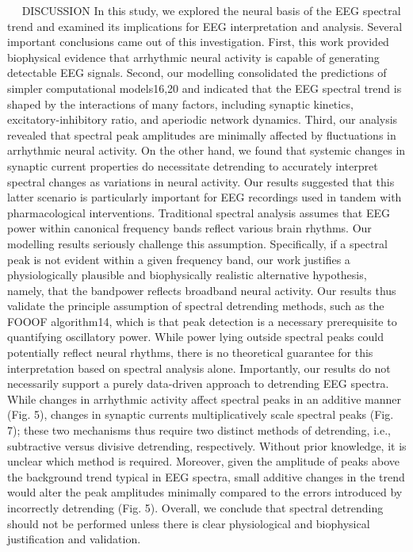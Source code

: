  
DISCUSSION 
In this study, we explored the neural basis of the EEG spectral trend and examined its implications for EEG interpretation and analysis. Several important conclusions came out of this investigation. First, this work provided biophysical evidence that arrhythmic neural activity is capable of generating detectable EEG signals. Second, our modelling consolidated the predictions of simpler computational models16,20 and indicated that the EEG spectral trend is shaped by the interactions of many factors, including synaptic kinetics, excitatory-inhibitory ratio, and aperiodic network dynamics. Third, our analysis revealed that spectral peak amplitudes are minimally affected by fluctuations in arrhythmic neural activity. On the other hand, we found that systemic changes in synaptic current properties do necessitate detrending to accurately interpret spectral changes as variations in neural activity. Our results suggested that this latter scenario is particularly important for EEG recordings used in tandem with pharmacological interventions. 
Traditional spectral analysis assumes that EEG power within canonical frequency bands reflect various brain rhythms. Our modelling results seriously challenge this assumption. Specifically, if a spectral peak is not evident within a given frequency band, our work justifies a physiologically plausible and biophysically realistic alternative hypothesis, namely, that the bandpower reflects broadband neural activity. Our results thus validate the principle assumption of spectral detrending methods, such as the FOOOF algorithm14, which is that peak detection is a necessary prerequisite to quantifying oscillatory power. While power lying outside spectral peaks could potentially reflect neural rhythms, there is no theoretical guarantee for this interpretation based on spectral analysis alone. 
Importantly, our results do not necessarily support a purely data-driven approach to detrending EEG spectra. While changes in arrhythmic activity affect spectral peaks in an additive manner (Fig. 5), changes in synaptic currents multiplicatively scale spectral peaks (Fig. 7); these two mechanisms thus require two distinct methods of detrending, i.e., subtractive versus divisive detrending, respectively. Without prior knowledge, it is unclear which method is required. Moreover, given the amplitude of peaks above the background trend typical in EEG spectra, small additive changes in the trend would alter the peak amplitudes minimally compared to the errors introduced by incorrectly detrending (Fig. 5). Overall, we conclude that spectral detrending should not be performed unless there is clear physiological and biophysical justification and validation. 
